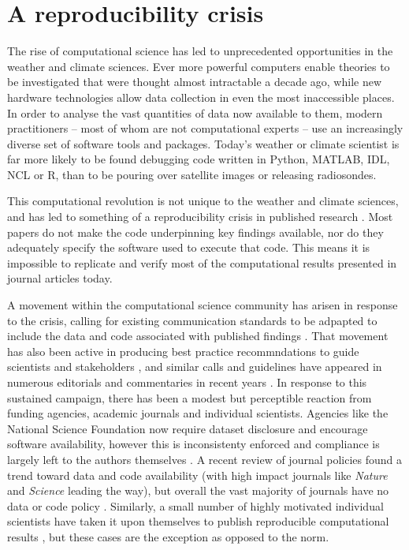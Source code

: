 \section{A reproducibility crisis}
The rise of computational science has led to unprecedented opportunities in the weather and climate sciences. Ever more powerful computers enable theories to be investigated that were thought almost intractable a decade ago, while new hardware technologies allow data collection in even the most inaccessible places. In order to analyse the vast quantities of data now available to them, modern practitioners – most of whom are not computational experts – use an increasingly diverse set of software tools and packages. Today's weather or climate scientist is far more likely to be found debugging code written in Python, MATLAB, IDL, NCL or R, than to be pouring over satellite images or releasing radiosondes. 

This computational revolution is not unique to the weather and climate sciences, and has led to something of a reproducibility crisis in published research \citep[e.g.][]{Peng2011}. Most papers do not make the code underpinning key findings available, nor do they adequately specify the software used to execute that code. This means it is impossible to replicate and verify most of the computational results presented in journal articles today.

A movement within the computational science community has arisen in response to the crisis, calling for existing communication standards to be adpapted to include the data and code associated with published findings \citep[e.g.][]{Stodden2014}. That movement has also been active in producing best practice recommndations to guide scientists and stakeholders \citep[e.g.][]{Stodden2012a,Stodden2014,Wilson2014}, and similar calls and guidelines have appeared in numerous editorials and commentaries in recent years \citep[e.g.][]{Barnes2010,Ince2012,Merali2010}. In response to this sustained campaign, there has been a modest but perceptible reaction from funding agencies, academic journals and individual scientists. Agencies like the National Science Foundation now require dataset disclosure and encourage software availability, however this is inconsistenty enforced and compliance is largely left to the authors themselves \citep{Stodden2013}. A recent review of journal policies found a trend toward data and code availability (with high impact journals like \textit{Nature} and \textit{Science} leading the way), but overall the vast majority of journals have no data or code policy \citep{Stodden2013}. Similarly, a small number of highly motivated individual scientists have taken it upon themselves to publish reproducible computational results \citep[e.g.][]{Crooks2014,Ketcheson2012,Schmitt2015}, but these cases are the exception as opposed to the norm.

